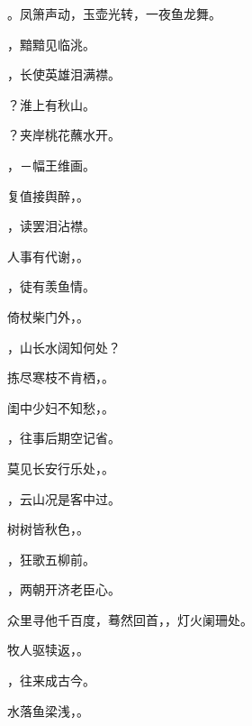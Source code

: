 \documentclass[12pt, a4paper, addpoints]{exam}
\begin{document}
\begin{multicols}{2}
\begin{questions}
\question[2] \uline{\qquad\qquad\qquad}。凤箫声动，玉壶光转，一夜鱼龙舞。

\question[2] \uline{\qquad\qquad\qquad}，黯黯见临洮。

\question[2] \uline{\qquad\qquad\qquad}，长使英雄泪满襟。

\question[1] \uline{\qquad\qquad\qquad}？淮上有秋山。

\question[2] \uline{\qquad\qquad\qquad}？夹岸桃花蘸水开。

\question[2] \uline{\qquad\qquad\qquad}，－幅王维画。

\question[2] 复值接舆醉，\uline{\qquad\qquad\qquad}。

\question[2] \uline{\qquad\qquad\qquad}，读罢泪沾襟。

\question[2] 人事有代谢，\uline{\qquad\qquad\qquad}。

\question[2] \uline{\qquad\qquad\qquad}，徒有羡鱼情。

\question[2] 倚杖柴门外，\uline{\qquad\qquad\qquad}。

\question[2] \uline{\qquad\qquad\qquad}，山长水阔知何处？

\question[2] 拣尽寒枝不肯栖，\uline{\qquad\qquad\qquad}。

\question[2] 闺中少妇不知愁，\uline{\qquad\qquad\qquad}。

\question[2] \uline{\qquad\qquad\qquad}，往事后期空记省。

\question[1] 莫见长安行乐处，\uline{\qquad\qquad\qquad}。

\question[1] \uline{\qquad\qquad\qquad}，云山况是客中过。

\question[2] 树树皆秋色，\uline{\qquad\qquad\qquad}。

\question[2] \uline{\qquad\qquad\qquad}，狂歌五柳前。

\question[2] \uline{\qquad\qquad\qquad}，两朝开济老臣心。

\question[2] 众里寻他千百度，蓦然回首，\uline{\qquad\qquad\qquad}，灯火阑珊处。

\question[2] 牧人驱犊返，\uline{\qquad\qquad\qquad}。

\question[2] \uline{\qquad\qquad\qquad}，往来成古今。

\question[2] 水落鱼梁浅，\uline{\qquad\qquad\qquad}。

\end{questions}
\end{multicols}
\end{document}
